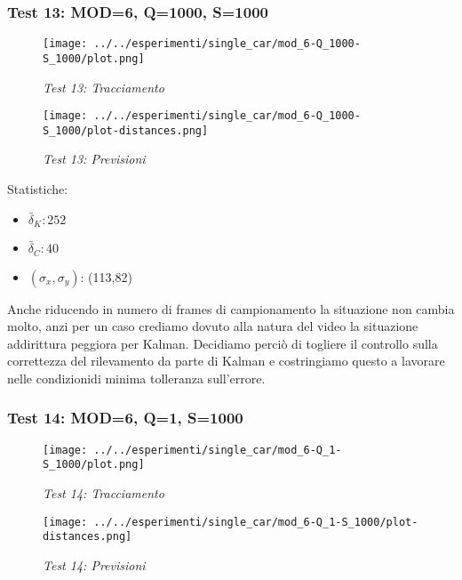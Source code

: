 \newpage
\subsubsection{Test 13: MOD=6, Q=1000, S=1000}

\begin{figure}[hb]
\centering
\texttt{[image: ../../esperimenti/single\_car/mod\_6-Q\_1000-S\_1000/plot.png]}
\caption{\textit{Test 13: Tracciamento}}
\end{figure}

\begin{figure}[hb]
\centering
\texttt{[image: ../../esperimenti/single\_car/mod\_6-Q\_1000-S\_1000/plot-distances.png]}
\caption{\textit{Test 13: Previsioni}}
\end{figure}

Statistiche:
\begin{itemize}
\item \begin{math} \bar \delta_K: 252 \end{math}
\item \begin{math} \bar \delta_C: 40 \end{math}
\item \begin{math}(\sigma_x,\sigma_y)\end{math}: (113,82)
\end{itemize}

Anche riducendo in numero di frames di campionamento la situazione non cambia molto, anzi per un caso crediamo dovuto alla natura del video la situazione addirittura peggiora per Kalman.
Decidiamo perciò di togliere il controllo sulla correttezza del rilevamento da parte di Kalman e costringiamo questo a lavorare nelle condizionidi minima tolleranza sull'errore.

\newpage
\subsubsection{Test 14: MOD=6, Q=1, S=1000}

\begin{figure}[hb]
\centering
\texttt{[image: ../../esperimenti/single\_car/mod\_6-Q\_1-S\_1000/plot.png]}
\caption{\textit{Test 14: Tracciamento}}
\end{figure}

\begin{figure}[hb]
\centering
\texttt{[image: ../../esperimenti/single\_car/mod\_6-Q\_1-S\_1000/plot-distances.png]}
\caption{\textit{Test 14: Previsioni}}
\end{figure}

